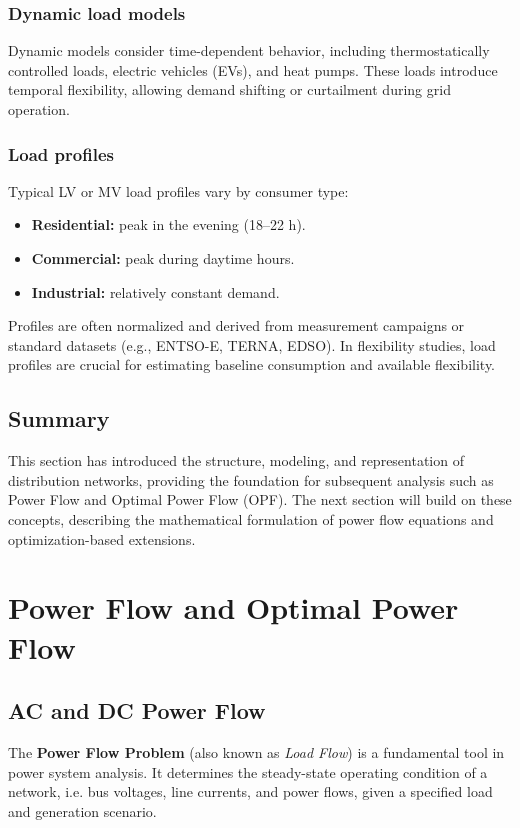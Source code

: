 \documentclass[11pt]{article}
\begin{document}
	\subsubsection*{Dynamic load models}
	Dynamic models consider time-dependent behavior, including thermostatically controlled loads, electric vehicles (EVs), and heat pumps.  
	These loads introduce temporal flexibility, allowing demand shifting or curtailment during grid operation.
	
	\subsubsection*{Load profiles}
	Typical LV or MV load profiles vary by consumer type:
	\begin{itemize}
		\item \textbf{Residential:} peak in the evening (18–22 h).
		\item \textbf{Commercial:} peak during daytime hours.
		\item \textbf{Industrial:} relatively constant demand.
	\end{itemize}
	Profiles are often normalized and derived from measurement campaigns or standard datasets (e.g., ENTSO-E, TERNA, EDSO).  
	In flexibility studies, load profiles are crucial for estimating baseline consumption and available flexibility.
	
	\subsection*{Summary}
	
	This section has introduced the structure, modeling, and representation of distribution networks, providing the foundation for subsequent analysis such as Power Flow and Optimal Power Flow (OPF).  
	The next section will build on these concepts, describing the mathematical formulation of power flow equations and optimization-based extensions.
	
	
	\section{Power Flow and Optimal Power Flow}
	
	\subsection{AC and DC Power Flow}
	
	The \textbf{Power Flow Problem} (also known as \textit{Load Flow}) is a fundamental tool in power system analysis.  
	It determines the steady-state operating condition of a network, i.e. bus voltages, line currents, and power flows, given a specified load and generation scenario.
	
\end{document}
